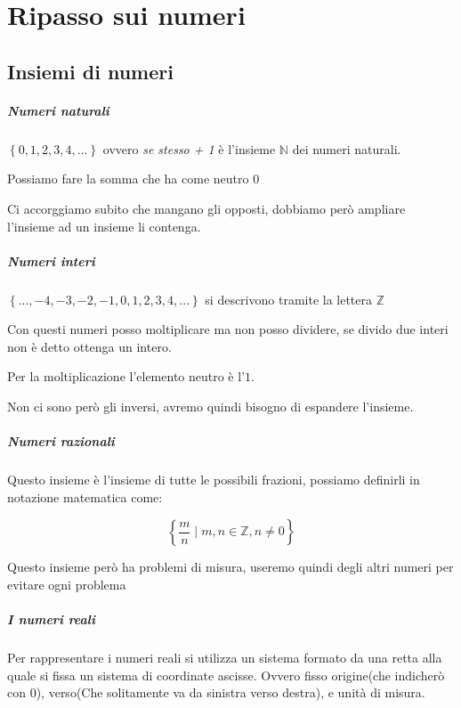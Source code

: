 \chapter{Ripasso sui numeri}

\section{Insiemi di numeri}

\paragraph{Numeri naturali}
$\left\{ 0,1,2,3,4,...\right\}$ ovvero \textit{se stesso + 1} è l'insieme $\mathbb{N}$ dei numeri naturali.

Possiamo fare la somma che ha come neutro 0

Ci accorggiamo subito che mangano gli opposti, dobbiamo però ampliare l'insieme ad un insieme li contenga.

\paragraph{Numeri interi}
$\left\{ ...,-4,-3,-2,-1,0,1,2,3,4,...\right\}$ si descrivono tramite la lettera $\mathbb{Z}$

Con questi numeri posso moltiplicare ma non posso dividere, se divido due interi non è detto ottenga un intero.

Per la moltiplicazione l'elemento neutro è l'$1$.

Non ci sono però gli inversi, avremo quindi bisogno di espandere l'insieme.

\paragraph{Numeri razionali} Questo insieme è l'insieme di tutte le possibili frazioni, possiamo definirli in notazione matematica come:

\[ \left\{ \frac{m}{n} \mid m,n\in \mathbb{Z} , n \neq 0 \right\} \]

Questo insieme però ha problemi di misura, useremo quindi degli altri numeri per evitare ogni problema

\paragraph{I numeri reali}

Per rappresentare i numeri reali si utilizza un sistema formato da una retta alla quale si fissa un sistema di coordinate ascisse. Ovvero fisso origine(che indicherò con 0), verso(Che solitamente va da sinistra verso destra), e unità di misura.

